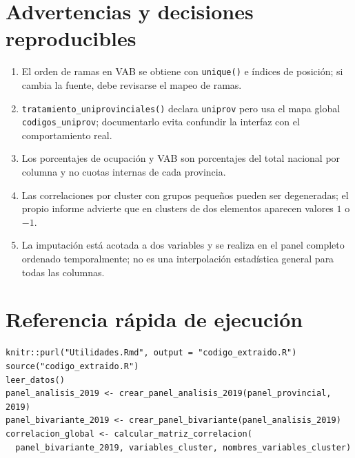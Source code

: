 \documentclass[10pt,a4paper]{article}
\newcommand{\code}[1]{\texttt{\small #1}}
\begin{document}
\section{Advertencias y decisiones reproducibles}
\begin{enumerate}[leftmargin=1.6em]
\item El orden de ramas en VAB se obtiene con \code{unique()} e índices de posición; si cambia la fuente, debe revisarse el mapeo de ramas.
\item \code{tratamiento\_uniprovinciales()} declara \code{uniprov} pero usa el mapa global \code{codigos\_uniprov}; documentarlo evita confundir la interfaz con el comportamiento real.
\item Los porcentajes de ocupación y VAB son porcentajes del total nacional por columna y no cuotas internas de cada provincia.
\item Las correlaciones por cluster con grupos pequeños pueden ser degeneradas; el propio informe advierte que en clusters de dos elementos aparecen valores $1$ o $-1$.
\item La imputación está acotada a dos variables y se realiza en el panel completo ordenado temporalmente; no es una interpolación estadística general para todas las columnas.
\end{enumerate}

\section*{Referencia rápida de ejecución}
\begin{lstlisting}
knitr::purl("Utilidades.Rmd", output = "codigo_extraido.R")
source("codigo_extraido.R")
leer_datos()
panel_analisis_2019 <- crear_panel_analisis_2019(panel_provincial, 2019)
panel_bivariante_2019 <- crear_panel_bivariante(panel_analisis_2019)
correlacion_global <- calcular_matriz_correlacion(
  panel_bivariante_2019, variables_cluster, nombres_variables_cluster)
\end{lstlisting}
\end{document}
